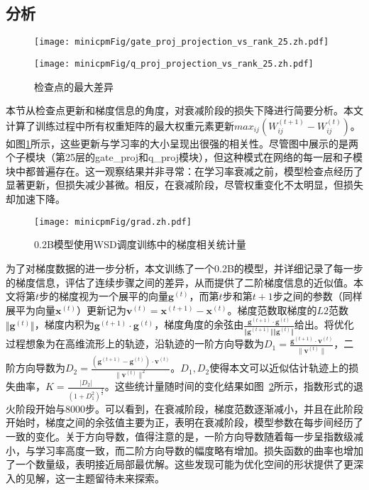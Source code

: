 \subsection{分析}
\begin{figure}[htbp]
    \centering
    \begin{minipage}[b]{0.7\linewidth}
        \centering
        \texttt{[image: minicpmFig/gate\_proj\_projection\_vs\_rank\_25.zh.pdf]}
    \end{minipage}
    \vspace{0.5cm} %
    \begin{minipage}[b]{0.7\linewidth}
        \centering
        \texttt{[image: minicpmFig/q\_proj\_projection\_vs\_rank\_25.zh.pdf]}
    \end{minipage}
    \caption{检查点的最大差异}
    \label{fig:appmaxdiff}
\end{figure}
本节从检查点更新和梯度信息的角度，对衰减阶段的损失下降进行简要分析。本文计算了训练过程中所有权重矩阵的最大权重元素更新$max_{ij} (W_{ij}^{(t + 1)} - W_{ij}^{(t)})$。如图\ref{fig:appmaxdiff}所示，这些更新与学习率的大小呈现出很强的相关性。尽管图中展示的是两个子模块（第25层的gate\_proj和q\_proj模块），但这种模式在网络的每一层和子模块中都普遍存在。这一观察结果并非寻常：在学习率衰减之前，模型检查点经历了显著更新，但损失减少甚微。相反，在衰减阶段，尽管权重变化不太明显，但损失却加速下降。  




\begin{figure}[htbp]
    \centering
        \centering
        \texttt{[image: minicpmFig/grad.zh.pdf]}
     \caption{0.2B模型使用WSD调度训练中的梯度相关统计量}
        \label{fig:grad}
\end{figure}

为了对梯度数据的进一步分析，本文训练了一个0.2B的模型，并详细记录了每一步的梯度信息，评估了连续步骤之间的差异，从而提供了二阶梯度信息的近似值。本文将第$t$步的梯度视为一个展平的向量$\mathbf{g}^{(t)}$，而第$t$步和第$t+1$步之间的参数（同样展平为向量$\mathbf{x}^{(t)}$）更新记为$\mathbf{v}^{(t)} = \mathbf{x}^{(t+1)} - \mathbf{x}^{(t)}$。梯度范数取梯度的$L2$范数$\Vert\mathbf{g}^{(t)} \Vert$，梯度内积为$\mathbf{g}^{(t+1)} \cdot \mathbf{g}^{(t)}$，梯度角度的余弦由$\frac{\mathbf{g}^{(t+1)} \cdot \mathbf{g}^{(t)}}  {\Vert\mathbf{g}^{(t+1)} \Vert \Vert\mathbf{g}^{(t)} \Vert}$给出。将优化过程想象为在高维流形上的轨迹，沿轨迹的一阶方向导数为$D_1 = \frac{\mathbf{g}^{(t+1)} \cdot \mathbf{v}^{(t)}}{\|\mathbf{v}^{(t)}\|}
$，二阶方向导数为$D_2 = \frac{(\mathbf{g}^{(t+1)} - \mathbf{g}^{(t)}) \cdot \mathbf{v}^{(t)}}{\|\mathbf{v}^{(t)}\|^2}
$。$D_1, D_2$使得本文可以近似估计轨迹上的损失曲率，$K = \frac{|D_2|}{(1 + D_1^2)^{\frac{3}{2}}}$。这些统计量随时间的变化结果如图~\ref{fig:grad}所示，指数形式的退火阶段开始与8000步。可以看到，在衰减阶段，梯度范数逐渐减小，并且在此阶段开始时，梯度之间的余弦值主要为正，表明在衰减阶段，模型参数在每步间经历了一致的变化。关于方向导数，值得注意的是，一阶方向导数随着每一步呈指数级减小，与学习率高度一致，而二阶方向导数的幅度略有增加。损失函数的曲率也增加了一个数量级，表明接近局部最优解。这些发现可能为优化空间的形状提供了更深入的见解，这一主题留待未来探索。

